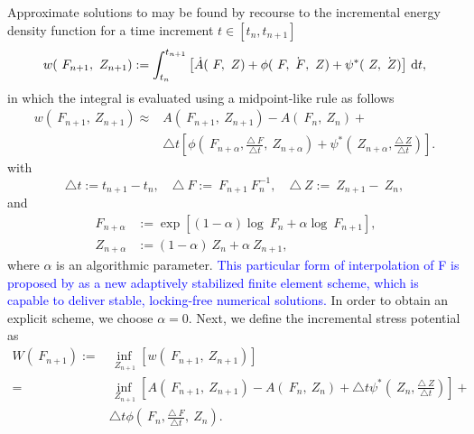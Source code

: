 \documentclass[12pt]{article}
\numberwithin{equation}{section}
\begin{document}
Approximate solutions to  may be found by
recourse to the incremental energy density function for a time
increment $t \in [t_n, t_{n+1}]$
\begin{equation} \label{incremental-energy-density}
  w(~F_{n+1}, ~Z_{n+1}) :=
  \int_{t_n}^{t_{n+1}}
  \left[
    \dot{A}(~F, ~Z)
    +
    \phi(~F, \dot{~F}, ~Z)
    +
    \psi^*(~Z, \dot{~Z})
  \right]
  \, \mathop{}\!\mathrm{d} t,
\end{equation}
in which the integral is evaluated using a midpoint-like rule
as follows
\begin{equation} \label{incremental-energy-density-mid-point}
  \begin{split}
    w(~F_{n+1}, ~Z_{n+1}) \approx
    &
    A(~F_{n+1}, ~Z_{n+1}) - A(~F_n, ~Z_n) +
    \\
    &
    \triangle t
    \left[
      \phi
      \left(
        ~F_{n+\alpha}, \frac{\triangle ~F}{\triangle t}, ~Z_{n+\alpha}
      \right)
      +
      \psi^*
      \left(
        ~Z_{n+\alpha}, \frac{\triangle ~Z}{\triangle t}
      \right)
    \right].
  \end{split}
\end{equation}
with
\begin{equation} \label{eq:increments}
  \triangle t := t_{n+1} - t_n,
  \quad
  \triangle ~F := ~F_{n+1} ~F_n^{-1},
  \quad
  \triangle ~Z := ~Z_{n+1} - ~Z_n,
\end{equation}
and
\begin{equation} \label{eq:mid-values}
  \begin{split}
    ~F_{n+\alpha} & := \exp[(1 - \alpha) \log ~F_n + \alpha \log ~F_{n+1}],
    \\
    ~Z_{n+\alpha} & := (1 - \alpha) ~Z_n + \alpha ~Z_{n+1},
  \end{split}
\end{equation}
where $\alpha$ is an algorithmic parameter. \textcolor{blue}{This particular form of interpolation of F is proposed by \citet{Sun.etal:2013} as a new adaptively stabilized finite element scheme, which is capable to deliver stable, locking-free numerical solutions.} In order to obtain an
explicit scheme, we choose $\alpha = 0$. Next, we define the
incremental stress potential as
\begin{equation} \label{eq:incremental-stress-potential}
  \begin{split}
    W(~F_{n+1})
    :=
    &
    \inf_{~Z_{n+1}}[w(~F_{n+1}, ~Z_{n+1})]
    \\
    =
    &
    \inf_{~Z_{n+1}}
    \left[
      A(~F_{n+1}, ~Z_{n+1}) - A(~F_n, ~Z_n)
      +
      \triangle t
      \psi^*\left(~Z_n, \frac{\triangle ~Z}{\triangle t}\right)
    \right]
    +
    \\
    &
    \triangle t
    \phi\left(~F_n, \frac{\triangle ~F}{\triangle t}, ~Z_n\right).
  \end{split}
\end{equation}
\end{document}
